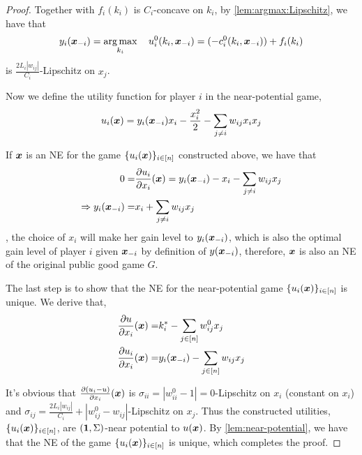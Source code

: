 \begin{proof}
Together with $f_i(k_i)$ is $C_i$-concave on $k_i$, by \cref{lem:argmax:Lipschitz}, we have that
\begin{align*}
    y_i({\bm{x}}_{-i}) = \operatorname*{arg\,max}_{k_i}\quad u^0_i(k_i,{\bm{x}}_{-i}) = ( - c^0_i(k_i, {\bm{x}}_{-i})) + f_i(k_i)
\end{align*}
is $\frac{2L_i|w_{ij}|}{C_i}$-Lipschitz on $x_j$.


Now we define the utility function for player $i$ in the near-potential game,
\begin{align*}
    u_i({\bm{x}}) = y_i({\bm{x}}_{-i}) x_i - \frac{x_i^2}{2} - \sum_{j\ne i} w_{ij} x_i x_j
\end{align*}

If ${\bm{x}}$ is an NE for the game $\{u_i({\bm{x}})\}_{i\in[n]}$ constructed above, we have that
\begin{align}
    0 =& \frac{\partial u_i}{\partial x_i}({\bm{x}}) = y_i({\bm{x}}_{-i}) - x_i - \sum_{j\ne i} w_{ij} x_j
    \\
    \Rightarrow y_i({\bm{x}}_{-i}) =& x_i + \sum_{j\ne i} w_{ij} x_j
\end{align}
\ie, the choice of $x_i$ will make her gain level to $y_i({\bm{x}}_{-i})$, which is also the optimal gain level of player $i$ given ${\bm{x}}_{-i}$ by definition of $y({\bm{x}}_{-i})$, therefore, ${\bm{x}}$ is also an NE of the original public good game $G$.

The last step is to show that the NE for the near-potential game $\{u_i({\bm{x}})\}_{i\in[n]}$ is unique. We derive that,
\begin{align*}
    \frac{\partial u}{\partial x_i}({\bm{x}}) =& k^*_i - \sum_{j\in[n]} w^0_{ij} x_j
    \\
    \frac{\partial u_i}{\partial x_i}({\bm{x}}) =& y_i({\bm{x}}_{-i}) - \sum_{j\in[n]} w_{ij} x_j
\end{align*}

It's obvious that $\frac{\partial (u_i - u)}{\partial x_i}({\bm{x}})$ is $\sigma_{ii} = |w^0_{ii} - 1| = 0$-Lipschitz on $x_i$ (constant on $x_i$) and $\sigma_{ij} = \frac{2L_i|w_{ij}|}{C_i} + |w^0_{ij} - w_{ij}|$-Lipschitz on $x_j$. Thus the constructed utilities, $\{u_i({\bm{x}})\}_{i\in[n]}$, are $(\mathbf{1},\Sigma)$-near potential to $u({\bm{x}})$. By \cref{lem:near-potential}, we have that the NE of the game $\{u_i({\bm{x}})\}_{i\in[n]}$ is unique, which completes the proof.

\end{proof}
